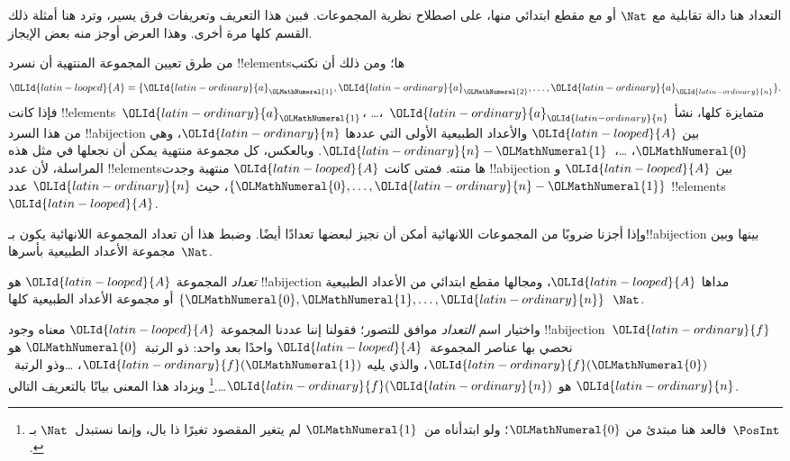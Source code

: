 \documentclass[../../../include/open-logic-section]{subfiles}
\begin{document}


\begin{editorial}
التعداد هنا دالة تقابلية مع $\Nat$ أو مع مقطع ابتدائي منها، على اصطلاح نظرية المجموعات. فبين هذا التعريف وتعريفات  فرق يسير، وترد هنا أمثلة ذلك القسم كلها مرة أخرى. وهذا العرض أوجز منه بعض الإيجاز.
\end{editorial}

من طرق تعيين المجموعة المنتهية أن نسرد !!{element}sها؛ ومن ذلك أن نكتب
\[
  \OLId{latin-looped}{A} = \{\OLId{latin-ordinary}{a}_\OLMathNumeral{1}, \OLId{latin-ordinary}{a}_\OLMathNumeral{2}, \ldots, \OLId{latin-ordinary}{a}_\OLId{latin-ordinary}{n}\}.
\]
فإذا كانت !!{element}s~$\OLId{latin-ordinary}{a}_\OLMathNumeral{1}$، \dots،~$\OLId{latin-ordinary}{a}_\OLId{latin-ordinary}{n}$ متمايزة كلها، نشأ من هذا السرد !!a{bijection} بين $\OLId{latin-looped}{A}$ والأعداد الطبيعية الأولى التي عددها $\OLId{latin-ordinary}{n}$، وهي $\OLMathNumeral{0}$، \dots،~$\OLId{latin-ordinary}{n}-\OLMathNumeral{1}$. وبالعكس، كل مجموعة منتهية يمكن أن نجعلها في مثل هذه المراسلة، لأن عدد !!{element}sها منته. فمتى كانت $\OLId{latin-looped}{A}$ منتهية وجدت !!a{bijection} بين $\OLId{latin-looped}{A}$ و$\{\OLMathNumeral{0}, \dots, \OLId{latin-ordinary}{n}-\OLMathNumeral{1}\}$، حيث $\OLId{latin-ordinary}{n}$ عدد !!{element}s~$\OLId{latin-looped}{A}$.

وإذا أجزنا ضروبًا من المجموعات اللانهائية أمكن أن نجيز لبعضها تعدادًا أيضًا. وضبط هذا أن تعداد المجموعة اللانهائية يكون بـ!!a{bijection} بينها وبين مجموعة الأعداد الطبيعية بأسرها~$\Nat$.

\begin{defn}
\emph{تعداد} المجموعة $\OLId{latin-looped}{A}$ هو !!a{bijection} مداها $\OLId{latin-looped}{A}$، ومجالها مقطع ابتدائي من الأعداد الطبيعية $\{\OLMathNumeral{0}, \OLMathNumeral{1}, \ldots, \OLId{latin-ordinary}{n}\}$ {أو} مجموعة الأعداد الطبيعية كلها~$\Nat$.
\end{defn}

\begin{explain}
واختيار اسم \emph{التعداد} موافق للتصور؛ فقولنا إننا عددنا المجموعة $\OLId{latin-looped}{A}$ معناه وجود !!a{bijection}~$\OLId{latin-ordinary}{f}$ نحصي بها عناصر المجموعة~$\OLId{latin-looped}{A}$ واحدًا بعد واحد: ذو الرتبة~$\OLMathNumeral{0}$ هو $\OLId{latin-ordinary}{f}(\OLMathNumeral{0})$، والذي يليه $\OLId{latin-ordinary}{f}(\OLMathNumeral{1})$، \ldots وذو الرتبة~$\OLId{latin-ordinary}{n}$ هو $\OLId{latin-ordinary}{f}(\OLId{latin-ordinary}{n})$\ldots.\footnote{فالعد هنا مبتدئ من $\OLMathNumeral{0}$؛ ولو ابتدأناه من~$\OLMathNumeral{1}$ لم يتغير المقصود تغيرًا ذا بال، وإنما نستبدل~$\Nat$ بـ~$\PosInt$.} ويزداد هذا المعنى بيانًا بالتعريف التالي.
\end{explain}
\end{document}
